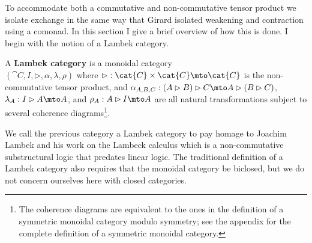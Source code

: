 
To accommodate both a commutative and non-commutative tensor product
we isolate exchange in the same way that Girard isolated weakening and
contraction using a comonad.  In this section I give a brief overview
of how this is done.  I begin with the notion of a Lambek category.
\begin{definition}
  \label{def:Lambek-category}
  A \textbf{Lambek category} is a monoidal category \\ $(\cat{C}, I,
  \rhd, \alpha, \lambda, \rho)$ where $\rhd : \cat{C} \times \cat{C}
  \mto \cat{C}$ is the non-commutative tensor product, and
  $\alpha_{A,B,C} : (A \rhd B) \rhd C \mto A \rhd (B \rhd C)$,
  $\lambda_A : I \rhd A \mto A$, and $\rho_A : A \rhd I \mto A$ are
  all natural transformations subject to several coherence
  diagrams\footnote{The coherence diagrams are equivalent to the ones
    in the definition of a symmetric monoidal category modulo
    symmetry; see the appendix for the complete definition of a
    symmetric monoidal category.}.
\end{definition}
\noindent
We call the previous category a Lambek category to pay homage to
Joachim Lambek and his work on the Lambeck calculus \cite{Lambek1958}
which is a non-commutative substructural logic that predates linear
logic.  The traditional definition of a Lambek category also requires
that the monoidal category be biclosed, but we do not concern
ourselves here with closed categories.

